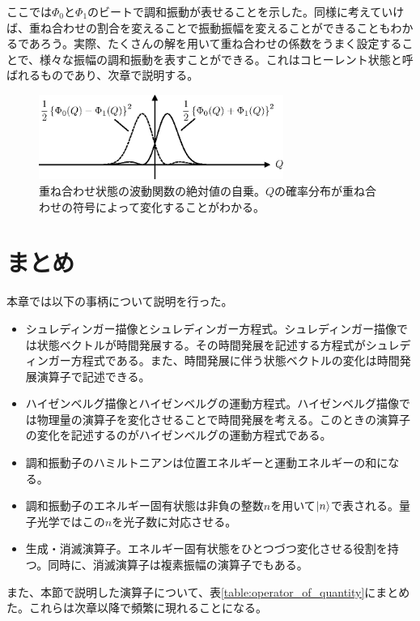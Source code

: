 ここでは$\Phi_0$と$\Phi_1$のビートで調和振動が表せることを示した。同様に考えていけば、重ね合わせの割合を変えることで振動振幅を変えることができることもわかるであろう。実際、たくさんの解を用いて重ね合わせの係数をうまく設定することで、様々な振幅の調和振動を表すことができる。これはコヒーレント状態と呼ばれるものであり、次章で説明する。

\begin{figure}
  \centering
  \includegraphics[width=8cm]{fig/2-3_superposition_state.eps} 
  \caption{重ね合わせ状態の波動関数の絶対値の自乗。$Q$の確率分布が重ね合わせの符号によって変化することがわかる。}
  \label{fig:superposition_state}
\end{figure}

\section{まとめ}
本章では以下の事柄について説明を行った。
\begin{itemize}
	\item シュレディンガー描像とシュレディンガー方程式。シュレディンガー描像では状態ベクトルが時間発展する。その時間発展を記述する方程式がシュレディンガー方程式である。また、時間発展に伴う状態ベクトルの変化は時間発展演算子で記述できる。
	\item ハイゼンベルグ描像とハイゼンベルグの運動方程式。ハイゼンベルグ描像では物理量の演算子を変化させることで時間発展を考える。このときの演算子の変化を記述するのがハイゼンベルグの運動方程式である。
	\item 調和振動子のハミルトニアンは位置エネルギーと運動エネルギーの和になる。
	\item 調和振動子のエネルギー固有状態は非負の整数$n$を用いて$\ket n$で表される。量子光学ではこの$n$を光子数に対応させる。
	\item 生成・消滅演算子。エネルギー固有状態をひとつづつ変化させる役割を持つ。同時に、消滅演算子は複素振幅の演算子でもある。
\end{itemize}
また、本節で説明した演算子について、表\ref{table:operator_of_quantity}にまとめた。これらは次章以降で頻繁に現れることになる。


